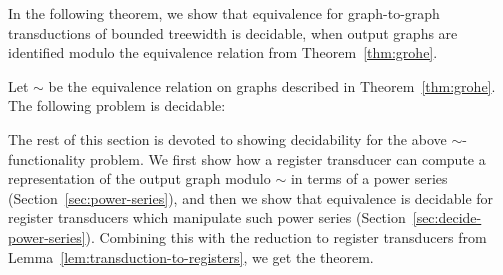 In the following theorem, we show that equivalence for graph-to-graph \mso transductions of bounded treewidth is decidable, when output graphs are identified modulo the equivalence relation from Theorem~\ref{thm:grohe}. 
\begin{theorem}\label{thm:path-equivalence}
    Let $\sim$ be the equivalence relation on graphs described in Theorem~\ref{thm:grohe}. 
    The following problem is decidable:
\end{theorem}
 
The rest of this section is devoted to showing decidability for the above $\sim$-functionality problem. We first show how a register transducer can compute a representation of the output graph modulo $\sim$ in terms of a power series (Section~\ref{sec:power-series}), and then we show that equivalence is decidable for register transducers which manipulate such power series (Section~\ref{sec:decide-power-series}). Combining this with the reduction to register transducers from Lemma~\ref{lem:transduction-to-registers}, we get the theorem.

